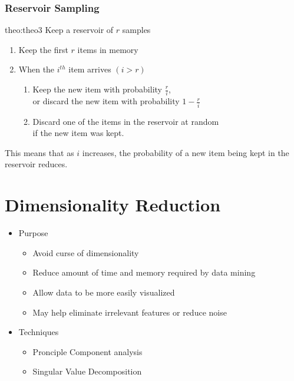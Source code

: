 \subsubsection{Reservoir Sampling}

\begin{theo}{theo:theo3}
    \label{eq:reservoir-sampling}
        Keep a reservoir of $r$ samples
        \begin{enumerate}
            \item Keep the first $r$ items in memory
            \item When the $i^{th}$ item arrives $(i>r)$
            \begin{enumerate}
                \item Keep the new item with probability $\frac{r}{i}$, \\
                or discard the new item with probability $1 - \frac{r}{i}$
                \item Discard one of the items in the reservoir at random \\
                if the new item was kept.
            \end{enumerate}
        \end{enumerate}

        This means that as $i$ increases, the probability of a new item being kept in the reservoir reduces.
    \end{theo}

\section{Dimensionality Reduction}
\begin{itemize}
    \item Purpose
    \begin{itemize}
        \item Avoid curse of dimensionality
        \item Reduce amount of time and memory required by data mining
        \item Allow data to be more easily visualized
        \item May help eliminate irrelevant features or reduce noise
    \end{itemize}
    \item Techniques
    \begin{itemize}
        \item Pronciple Component analysis
        \item Singular Value Decomposition
    \end{itemize}
\end{itemize}
